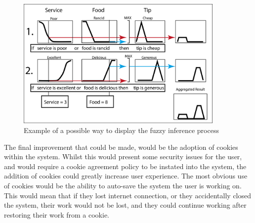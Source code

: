 \begin{figure}[ht!]
	\begin{center}
		\includegraphics[width=0.9\textwidth]{images/inference}
	\end{center}
	\vspace{-2mm}
	\caption{Example of a possible way to display the fuzzy inference process}
	\label{fig:fw-inf}
	\vspace{-1mm}
\end{figure}

\noindent
The final improvement that could be made, would be the adoption of cookies within the system. Whilst this would present some security issues for the user, and would require a cookie agreement policy to be instated into the system, the addition of cookies could greatly increase user experience. The most obvious use of cookies would be the ability to auto-save the system the user is working on. This would mean that if they lost internet connection, or they accidentally closed the system, their work would not be lost, and they could continue working after restoring their work from a cookie. 
\newpage 
